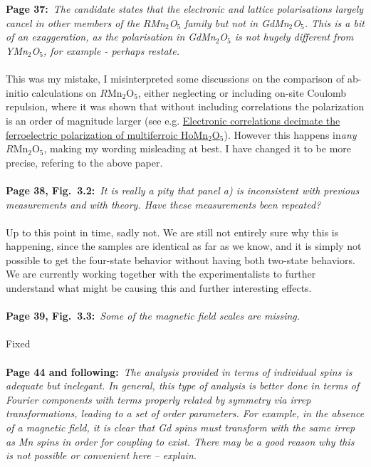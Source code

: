 \documentclass[a4, UTF8]{article}
\begin{document}
\\\\
{\bf Page 37:}~{\it The candidate states that the electronic and lattice polarisations largely cancel in other members of the $R$Mn$_2$O$_5$ family but not in GdMn$_2$O$_5$. This is a bit of an exaggeration, as the polarisation in GdMn$_2$O$_5$ is not hugely different from YMn$_2$O$_5$, for example - perhaps restate.}
\\\\
This was my mistake, I misinterpreted some discussions on the comparison of ab-initio calculations on $R$Mn$_2$O$_5$, either neglecting or including on-site Coulomb repulsion, where it was shown that without including correlations the polarization is an order of magnitude larger (see e.g. \href{https://arxiv.org/abs/0802.0653v1}{Electronic correlations decimate the ferroelectric polarization of multiferroic HoMn$_2$O$_5$}). However this happens in{\it any} $R$Mn$_2$O$_5$, making my wording misleading at best. I have changed it to be more precise, refering to the above paper. 
\\\\
{\bf Page 38, Fig.~3.2:}~{\it It is really a pity that panel a) is inconsistent with previous measurements and with theory. Have these measurements been repeated?}
\\\\
Up to this point in time, sadly not. We are still not entirely sure why this is happening, since the samples are identical as far as we know, and it is simply not possible to get the four-state behavior without having both two-state behaviors. We are currently working together with the experimentalists to further understand what might be causing this and further interesting effects.
\\\\
{\bf Page 39, Fig.~3.3:}~{\it Some of the magnetic field scales are missing.}
\\\\
Fixed
\\\\
{\bf Page 44 and following:}~{\it The analysis provided in terms of individual spins is adequate but
inelegant. In general, this type of analysis is better done in terms of Fourier components with
terms properly related by symmetry via irrep transformations, leading to a set of order parameters.
For example, in the absence of a magnetic field, it is clear that Gd spins must transform with the
same irrep as Mn spins in order for coupling to exist. There may be a good reason why this is not
possible or convenient here – explain.}
\end{document}

